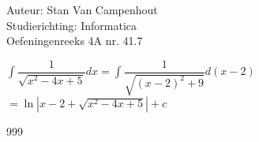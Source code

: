 \documentclass[a4paper]{article}
\begin{document}
  
\noindent \large Auteur: Stan Van Campenhout \\
\noindent \large Studierichting:  Informatica\\
\noindent \large Oefeningenreeks 4A nr. 41.7\\

\medskip

\normalsize

$ \displaystyle\int\dfrac{1}{\sqrt{x^2 -4x + 5}}dx = \displaystyle\int\dfrac{1}{\sqrt{\left(x-2\right)^2 + 9}}d\left(x-2\right) $\\

$ = \ln|x - 2 + \sqrt{x^2 -4x + 5}| + c $\\

\begin{thebibliography}{999}
\end{thebibliography}
\end{document}
